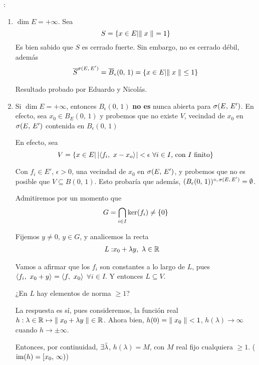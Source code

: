 \begin{ex}:\\
\begin{enumerate}
    \item $\dim E = + \infty$. Sea
    \begin{equation*}
        S = \conj{
        x \in E | \norm[]{x} = 1
        }
    \end{equation*}
    Es bien sabido que $S$ es cerrado fuerte. Sin embargo, no es cerrado débil, además
    \begin{equation*}
        \overline{S}^{\topdebilE} = \overline{B}_{\epsilon}(0,\, 1)= \conj{
        x \in E| \norm[]{x} \leq 1
        }
    \end{equation*}
    
    Resultado probado por Eduardo y Nicolás.
    
    \item Si $\dim E = + \infty$, entonces $B_{\epsilon} (0,\, 1)$ \textbf{no es} nunca abierta para $\topdebilE$. En efecto, sea $x_0 \in B_{E}(0,\, 1)$ y probemos que no existe $V$, vecindad de $x_0$ en $\topdebilE$ contenida en $B_{\epsilon} (0,\, 1)$
    
    En efecto, sea
    \begin{equation*}
        V = \conj{
        x \in E | \abs{\prodint[]{f_i}{x-x_o}} < \epsilon \ \forall i \in I \text{, con $I$ finito}
        }
    \end{equation*}
    
    Con $f_i \in E'$, $\epsilon > 0$, una vecindad de $x_0$ en $\topdebilE$, y probemos que no es posible que $V \subseteq B(0,\, 1)$. Esto probaría que además, $(B_\epsilon(0,\, 1))^{\circ,\, \topdebilE} = \emptyset$.
    
    Admitiremos por un momento que 
    \begin{equation*}
        G = \bigcap_{i\in I} \ker(f_i) \not = \conj{0}
    \end{equation*}
    
    Fijemos $y \not = 0$, $y \in G$, y analicemos la recta 
    \begin{eqnarray}
    L:& x_0 + \lambda y,\ \lambda \in \rr
    \end{eqnarray}
    
    Vamos a afirmar que los $f_i$ son constantes a lo largo de $L$, pues $\prodint[]{f_i}{x_0 + y} = \prodint[]{f}{x_0}$ $\forall i \in I$. Y entonces $L \subseteq V$.
    
    ¿En $L$ hay elementos de norma $\geq 1$?
    
    La respuesta es sí, pues consideremos, la función real $h: \lambda \in \rr \mapsto \norm[]{x_0 + \lambda y} \in \rr$. Ahora bien, $h(0) = \norm[]{x_0} < 1$, $h(\lambda) \to \infty$ cuando $h \to \pm \infty$.
    
    Entonces, por continuidad, $\exists \Bar{\lambda}$, $h(\lambda) = M$, con $M$ real fijo cualquiera $\geq 1$. ($\im(h) = [x_0,\, \infty)$)
    
\end{enumerate}
\end{ex}

